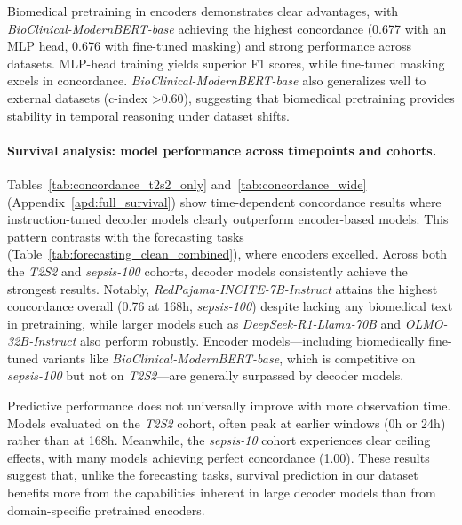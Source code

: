 \documentclass[letterpaper]{article} %
\begin{document}
Biomedical pretraining in encoders demonstrates clear advantages, with \textit{BioClinical-ModernBERT-base} achieving the highest concordance (0.677 with an MLP head, 0.676 with fine-tuned masking) and strong performance across datasets. MLP-head training yields superior F1 scores, while fine-tuned masking excels in concordance. \textit{BioClinical-ModernBERT-base} also generalizes well to external datasets (c-index \textgreater0.60), suggesting that biomedical pretraining provides stability in temporal reasoning under dataset shifts.

\paragraph{Survival analysis: model performance across timepoints and cohorts.}
Tables~\ref{tab:concordance_t2s2_only} and~\ref{tab:concordance_wide} (Appendix~\ref{apd:full_survival}) show time-dependent concordance results where 
instruction-tuned decoder models clearly outperform encoder-based models. This pattern contrasts with the forecasting tasks (Table~\ref{tab:forecasting_clean_combined}), where encoders excelled. Across both the \textit{T2S2} and \textit{sepsis-100} cohorts, decoder models consistently achieve the strongest results. Notably, \textit{RedPajama-INCITE-7B-Instruct} attains the highest concordance overall (0.76 at 168h, \textit{sepsis-100}) despite lacking any biomedical text in pretraining, while larger models such as \textit{DeepSeek-R1-Llama-70B} and \textit{OLMO-32B-Instruct} also perform robustly. Encoder models---including biomedically fine-tuned variants like \textit{BioClinical-ModernBERT-base}, which is competitive on \textit{sepsis-100} but not on \textit{T2S2}---are generally surpassed by decoder models.

Predictive performance does not universally improve with more observation time. Models evaluated on the \textit{T2S2} cohort, often peak at earlier windows (0h or 24h) rather than at 168h. Meanwhile, the \textit{sepsis-10} cohort experiences clear ceiling effects, with many models achieving perfect concordance (1.00). These results suggest that, unlike the forecasting tasks, survival prediction in our dataset benefits more from the capabilities inherent in large decoder models than from domain-specific pretrained encoders.

\end{document}
